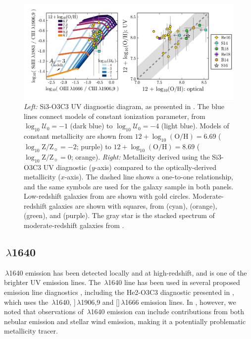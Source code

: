 \documentclass[trackchanges, preprint2]{aastex62}
\newcommand{\oiii}{[\ion{O}{3}]}
\newcommand{\heii}{\ion{He}{2}}
\newcommand{\ciii}{\ion{C}{3}]}
\newcommand{\logten}{\ensuremath{\log_{10}}}
\newcommand{\logOH}{\ensuremath{\logten (\mathrm{O}/\mathrm{H})}\xspace}
\newcommand{\logZeq}[1]{\ensuremath{\logten \mathrm{Z}/\mathrm{Z}_{\sun} = #1}}
\newcommand{\logUeq}[1]{\ensuremath{\logten \mathcal{U}_0 = #1}}
\begin{document}
\begin{figure}
  \begin{center}
    \includegraphics[width=\linewidth]{figs/f3.png}
    \caption{\emph{Left:} Si3-O3C3 UV diagnostic diagram, as presented in . The blue lines connect models of constant ionization parameter, from \logUeq{-1} (dark blue) to \logUeq{-4} (light blue). Models of constant metallicity are shown from $12+\logOH=6.69$ (\logZeq{-2}; purple) to $12+\logOH=8.69$ (\logZeq{0}; orange). \emph{Right:} Metallicity derived using the Si3-O3C3 UV diagnostic ($y$-axis) compared to the optically-derived metallicity ($x$-axis). The dashed line shows a one-to-one relationship, and the same symbols are used for the galaxy sample in both panels. Low-redshift galaxies from \citet{Berg+2016} are shown with gold circles. Moderate-redshift galaxies are shown with squares, from \citet{Stark+2014} (cyan), \citet{Bayliss+2014} (orange), \citet{Rigby+2018b} (green), and \citet{Berg+2018} (purple). The gray star is the stacked spectrum of moderate-redshift galaxies from \citet{Steidel+2016}.}
    \label{fig:UVSi}
  \end{center}
\end{figure}

\subsection{\heii$\,\lambda$1640}\label{sec:ZZ:He}

\heii$\,\lambda$1640 emission has been detected locally and at high-redshift, and is one of the brighter UV emission lines. The \heii$\,\lambda$1640 line has been used in several proposed emission line diagnostics \citep[e.g.,][]{Jaskot+2016, Feltre+2016}, including the He2-O3C3 diagnostic presented in , which uses the \heii$\,\lambda$1640, \ciii$\,\lambda$1906,9 and \oiii$\,\lambda$1666 emission lines. In , however, we noted that observations of \heii$\,\lambda$1640 emission can include contributions from both nebular emission and stellar wind emission, making it a potentially problematic metallicity tracer.
\end{document}
